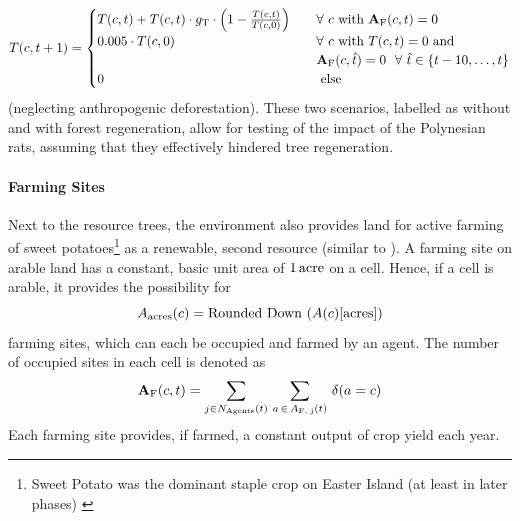 \begin{equation}\label{eq:treeupdate}
T(c,t+1)= \begin{cases}
T(c,t) + T(c,t) \cdot g_{\rm T} \cdot \left(1- \frac{T(c,t)}{T(c,0)}\right) \quad & \forall \ c \text{ with } \mathbf{A}_{\rm F}(c,t)=0 \\
0.005 \cdot T(c,0)  & \forall  \ c \text{ with } T(c,t)=0 \text{ and}\\
& \mathbf{A}_{\rm F}(c,\hat{t})=0 \  \ \forall \  \hat{t} \in \{t-10, \ldots, t\} \\
0 & \text{ else }
\end{cases}
\end{equation}
(neglecting anthropogenic deforestation).
These two scenarios, labelled as without and with forest regeneration, allow for testing of the impact of the Polynesian rats, assuming that they effectively hindered tree regeneration.

\paragraph{Farming Sites}
Next to the resource trees, the environment also provides land for active farming of sweet potatoes\footnote{Sweet Potato was the dominant staple crop on Easter Island (at least in later phases) \citep{Louwagie2006}} as a renewable, second resource (similar to \citep{dAlessandro2007}).
A farming site on arable land has a constant, basic unit area of $1\, {\rm acre}$ on a cell.%
Hence, if a cell is arable, it provides the possibility for 
\begin{equation}
A_{\rm acres}(c) = \text{Rounded Down }(A(c)[\text{acres}])
\end{equation}
farming sites, which can each be occupied and farmed by an agent.
The number of occupied sites in each cell is denoted as 
\begin{equation}\label{eq:occupied}
\mathbf{A}_{\rm F} (c, t)  = \sum_{j \in N_{\rm Agents}(t)} \, \sum_{a \, \in \, A_\text{F, j}(t)} \, \delta(a=c)
\end{equation}
Each farming site provides, if farmed, a constant output of crop yield each year. 

